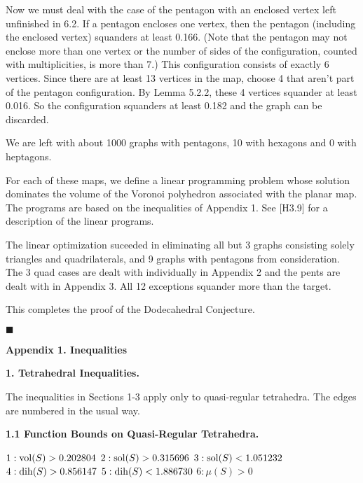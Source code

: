 Now we must deal with the case of the pentagon with an enclosed vertex left unfinished in 6.2.  
If a pentagon encloses one vertex, then the pentagon (including the enclosed vertex) squanders at least 0.166.  (Note that the pentagon may not enclose more than one vertex or the number of sides of the configuration, counted with multiplicities, is more than 7.)  This configuration consists of exactly 6 vertices.  Since there are at least 13 vertices in the map, choose 4 that aren't part of the pentagon configuration.  By Lemma 5.2.2, these 4 vertices squander at least 0.016.  So the configuration squanders at least 0.182 and the graph can be discarded.  

We are left with about 1000 graphs with pentagons, 10 with hexagons and 0 with heptagons.


For each of these maps, we define a linear programming problem whose solution dominates the volume of the Voronoi polyhedron associated with the planar map.  
The programs are based on the inequalities of Appendix 1.
See [H3.9] for a description of the linear programs.

The linear optimization suceeded in eliminating all but 3 graphs consisting 
solely triangles and quadrilaterals, and 9 graphs with pentagons from consideration.  The  3 quad cases are dealt with individually in Appendix 2 and the pents are dealt with in Appendix 3.  All 12 exceptions squander more than the target.  


\bigskip


This completes the proof of the Dodecahedral Conjecture.

$\blacksquare$

\bigskip




\bigskip

\centerline{\bf Appendix 1. Inequalities}

\bigskip

{\bf 1. Tetrahedral Inequalities.}

\smallskip

The inequalities in Sections 1-3 apply only to quasi-regular tetrahedra.
The edges are numbered in the usual way.

\smallskip

{\bf 1.1 Function Bounds on Quasi-Regular Tetrahedra.}


$1:  \operatorname{vol}(S) > 0.202804$\newline
$2:  \operatorname{sol}(S) > 0.315696$\newline
$3:  \operatorname{sol}(S) < 1.051232$\newline
$4:  \operatorname{dih}(S) > 0.856147$\newline
$5:  \operatorname{dih}(S) < 1.886730$\newline
$6:  \mu(S) > 0$\newline


